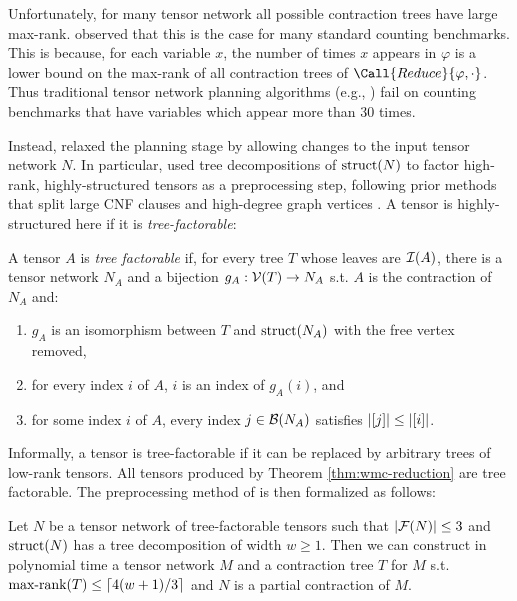 Unfortunately, for many tensor network all possible contraction trees have large max-rank. \cite{DDV19} observed that this is the case for many standard counting benchmarks. This is because, for each variable $x$, the number of times $x$ appears in $\varphi$ is a lower bound on the max-rank of all contraction trees of $\Call{Reduce}{\varphi, \cdot}$. Thus traditional tensor network planning algorithms (e.g., \cite{DFGHSW18,KCMR18,MS08}) fail on counting benchmarks that have variables which appear more than $30$ times. 

Instead, \cite{DDV19} relaxed the planning stage by allowing changes to the input tensor network $N$. In particular, \cite{DDV19} used tree decompositions of $\text{struct}(N)$ to factor high-rank, highly-structured tensors as a preprocessing step, following prior methods that split large CNF clauses \cite{SS10_2} and high-degree graph vertices \cite{oliveira18,MS11}. A tensor is highly-structured here if it is \emph{tree-factorable}:
\begin{definition} \label{def:tree-factorable}
A tensor $A$ is \emph{tree factorable} if, for every tree $T$ whose leaves are $\mathcal{I}(A)$, there is a tensor network $N_A$ and a bijection $g_A: \mathcal{V}(T) \rightarrow N_A$ s.t. $A$ is the contraction of $N_A$ and:
\begin{enumerate}\itemsep0em 
\item $g_A$ is an isomorphism between $T$ and $\text{struct}(N_A)$ with the free vertex removed,
\item for every index $i$ of $A$, $i$ is an index of $g_A(i)$, and
\item for some index $i$ of $A$, every index $j \in \mathcal{B}(N_A)$ satisfies $|[j]| \leq |[i]|$. %
\end{enumerate}
\end{definition}
Informally, a tensor is tree-factorable if it can be replaced by arbitrary trees of low-rank tensors. All tensors produced by Theorem \ref{thm:wmc-reduction} are tree factorable. 
The preprocessing method of \cite{DDV19} is then formalized as follows:
\begin{theorem} \label{thm:factorable-tree}
Let $N$ be a tensor network of tree-factorable tensors such that $|\mathcal{F}(N)| \leq 3$ and $\text{struct}(N)$ has a tree decomposition of width $w \geq 1$. Then we can construct in polynomial time a tensor network $M$ and a contraction tree $T$ for $M$ s.t. $\text{max-rank}(T) \leq \lceil4(w+1)/3\rceil$ and $N$ is a partial contraction of $M$.
\end{theorem}

